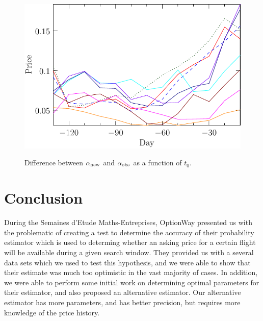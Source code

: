 \documentclass{article}
\def\anew{\alpha_{\rm{new}}}
\begin{document}
\begin{figure}
  \begin{center}
    \includegraphics{pdf/plotA1}
    \label{plotA1}
    \caption{Difference between $\anew$ and $\alpha_{\rm{obs}}$ as a
      function of $t_0$.}
  \end{center}
\end{figure}

\section{Conclusion}

During the Semaines d'Etude Maths-Entreprises, OptionWay presented us
with the problematic of creating a test to determine the accuracy of
their probability estimator which is used to determing whether an
asking price for a certain flight will be available during a given
search window.  They provided us with a several data sets which we
used to test this hypothesis, and we were able to show that their
estimate was much too optimistic in the vast majority of cases.  In
addition, we were able to perform some initial work on determining
optimal parameters for their estimator, and also proposed an
alternative estimator.  Our alternative estimator has more parameters,
and has better precision, but requires more knowledge of the price
history.
\end{document}
